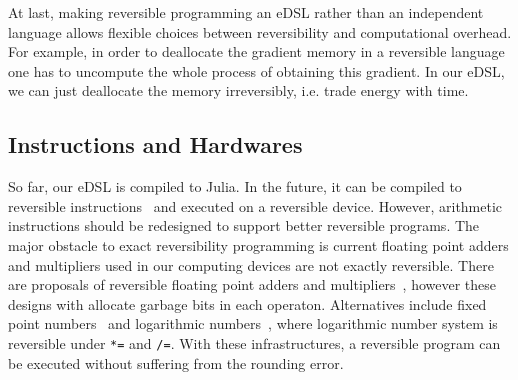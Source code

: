 \documentclass[aps,twocolumn,longbibliography,english,superscriptaddress]{revtex4-1}
\newcommand{\<}{\langle}
\renewcommand{\>}{\rangle}
\theoremstyle{definition}\newtheorem{definition}{\textit{Definition}}
\begin{document}
At last, making reversible programming an eDSL rather than an independent language allows flexible choices between reversibility and computational overhead. For example, in order to deallocate the gradient memory in a reversible language one has to uncompute the whole process of obtaining this gradient.
In our eDSL, we can just deallocate the memory irreversibly, i.e. trade energy with time.



\subsection{Instructions and Hardwares}\label{sec:hardware}
So far, our eDSL is compiled to Julia.
In the future, it can be compiled to reversible instructions~\cite{Vieri1999} and executed on a reversible device.
However, arithmetic instructions should be redesigned to support better reversible programs.
The major obstacle to exact reversibility programming is current floating point adders and multipliers used in our computing devices are not exactly reversible.
There are proposals of reversible floating point adders and multipliers~\cite{Nachtigal2010,Nachtigal2011,Nguyen2013,Hner2018}, however these designs with allocate garbage bits in each operaton.
Alternatives include fixed point numbers~\cite{FixedPointNumbers} and logarithmic numbers~\cite{Taylor1988,LogarithmicNumbers}, where logarithmic number system is reversible under \texttt{*=} and \texttt{/=}.
With these infrastructures, a reversible program can be executed without suffering from the rounding error.
\end{document}
